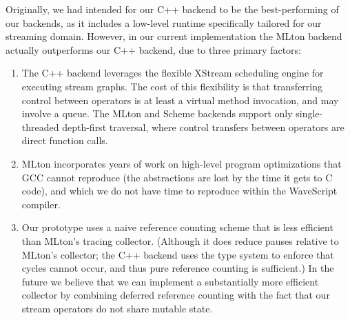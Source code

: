 \documentclass[twocolumn]{report}
\newcommand{\ws}{WaveScript}
\begin{document}
Originally, we had intended for our C++ backend to be the
best-performing of our backends, as it includes a low-level
runtime specifically tailored for our streaming domain.
However, in our current implementation the MLton backend actually
outperforms our C++ backend, due to three primary factors:  
%
\vspace{-1.5mm}
\begin{enumerate}

\item The C++ backend leverages the flexible XStream scheduling engine for
executing stream graphs.  The cost of this flexibility is that
transferring control between operators is at least a virtual method
invocation, and may involve a queue. The MLton and Scheme backends
support only single-threaded depth-first traversal, where control
transfers between operators are direct function calls.


\item MLton incorporates years of work on high-level program
optimizations that GCC cannot reproduce (the abstractions are lost by
the time it gets to C code), and which we do not have time to reproduce
within the {\ws} compiler.

\item Our prototype uses a naive reference counting scheme that is less
efficient than MLton's tracing collector.  (Although it does reduce
pauses relative to MLton's collector; the C++ backend uses the type
system to enforce that cycles cannot occur, and thus pure reference
counting is sufficient.) 
%
In the future we believe that we can implement a substantially more
efficient collector by combining deferred reference counting with the
fact that our stream operators do not share mutable state.


\end{enumerate}
%
\end{document}
